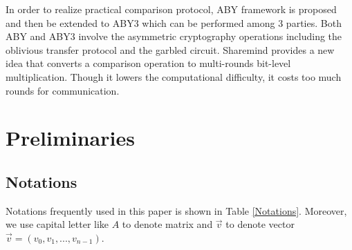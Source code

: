 \documentclass[letterpaper]{article} %
\begin{document}
    In order to realize practical comparison protocol, ABY framework \cite{ABY} is proposed
    and then be extended to ABY3 \cite{ABY3} which can be performed among 3 parties.
    Both ABY and ABY3 involve the asymmetric cryptography operations
    including the oblivious transfer protocol and the garbled circuit.
    Sharemind provides a new idea that converts a comparison operation to
    multi-rounds bit-level multiplication.
    Though it lowers the computational difficulty, it costs too much rounds for
    communication.



\section{Preliminaries}
    \subsection{Notations}

    \begin{table}
        \caption{Notations}
        \label{Notations}
    \end{table}
    Notations frequently used in this paper is shown in Table \ref{Notations}.
    Moreover, we use capital letter like $A$ to denote matrix and $\overrightarrow{v}$ to denote
    vector $\overrightarrow{v}=(v_{0},v_{1},...,v_{n-1})$.
\end{document}
